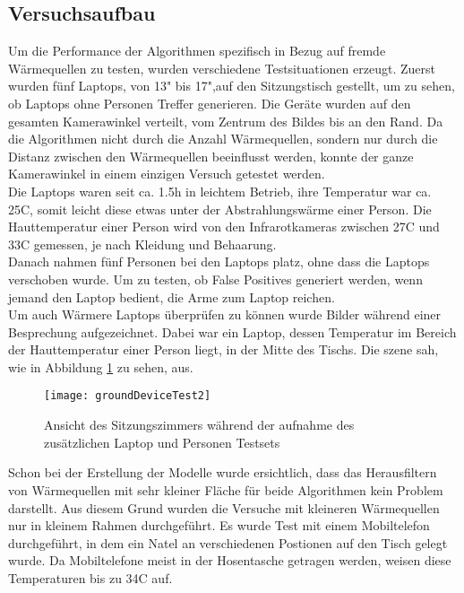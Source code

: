 \subsection{Versuchsaufbau}

Um die Performance der Algorithmen spezifisch in Bezug auf fremde Wärmequellen zu testen, wurden verschiedene Testsituationen erzeugt. Zuerst wurden fünf Laptops, von 13" bis 17",auf den Sitzungstisch gestellt, um zu sehen, ob Laptops ohne Personen Treffer generieren. Die Geräte wurden auf den gesamten Kamerawinkel verteilt, vom Zentrum des Bildes bis an den Rand. Da die Algorithmen nicht durch die Anzahl Wärmequellen, sondern nur durch die Distanz zwischen den Wärmequellen beeinflusst werden, konnte der ganze Kamerawinkel in einem einzigen Versuch getestet werden.\\
Die Laptops waren seit ca. 1.5h in leichtem Betrieb, ihre Temperatur war ca. 25\degree C, somit leicht diese etwas unter der Abstrahlungswärme einer Person. Die Hauttemperatur einer Person wird von den Infrarotkameras zwischen 27\degree C und 33\degree C gemessen, je nach Kleidung und Behaarung.\\
Danach nahmen fünf Personen bei den Laptops platz,  ohne dass die Laptops verschoben wurde. Um zu testen, ob False Positives generiert werden, wenn jemand den Laptop bedient, die Arme zum Laptop reichen.\\
Um auch Wärmere Laptops überprüfen zu können wurde Bilder während einer Besprechung aufgezeichnet. Dabei war ein Laptop, dessen Temperatur im Bereich der Hauttemperatur einer Person liegt, in der Mitte des Tischs. Die szene sah, wie in Abbildung \ref{fig:groundDeviceTest2} zu sehen, aus.
\\
\begin{figure}[H]
	\centering
	\texttt{[image: groundDeviceTest2]}
	\caption{Ansicht des Sitzungszimmers während der aufnahme des zusätzlichen Laptop und Personen Testsets}
	\label{fig:groundDeviceTest2}
\end{figure}
Schon bei der Erstellung der Modelle wurde ersichtlich, dass das Herausfiltern von Wärmequellen mit sehr kleiner Fläche für beide Algorithmen kein Problem darstellt. Aus diesem Grund wurden die Versuche mit kleineren Wärmequellen nur in kleinem Rahmen durchgeführt. Es wurde Test mit einem Mobiltelefon durchgeführt, in dem ein Natel an verschiedenen Postionen auf den Tisch gelegt wurde. Da Mobiltelefone meist in der Hosentasche getragen werden, weisen diese Temperaturen bis zu 34\degree C auf.\\
\\

